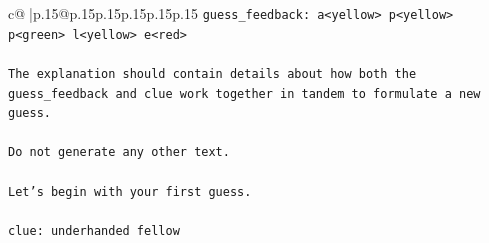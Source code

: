 \documentclass{article}
\begin{document}
{\begin{supertabular}{c@{$\;$}|p{.15\linewidth}@{}p{.15\linewidth}p{.15\linewidth}p{.15\linewidth}p{.15\linewidth}p{.15\linewidth}}
{{{\texttt{guess\_feedback: a<yellow> p<yellow> p<green> l<yellow> e<red>} \\
\\ 
\texttt{The explanation should contain details about how both the guess\_feedback and clue work together in tandem to formulate a new guess.} \\
\\ 
\texttt{Do not generate any other text.} \\
\\ 
\texttt{Let's begin with your first guess.} \\
\\ 
\texttt{clue: underhanded fellow} \\
            }
        }
    }
     \\ \\


\end{supertabular}}
\end{document}
